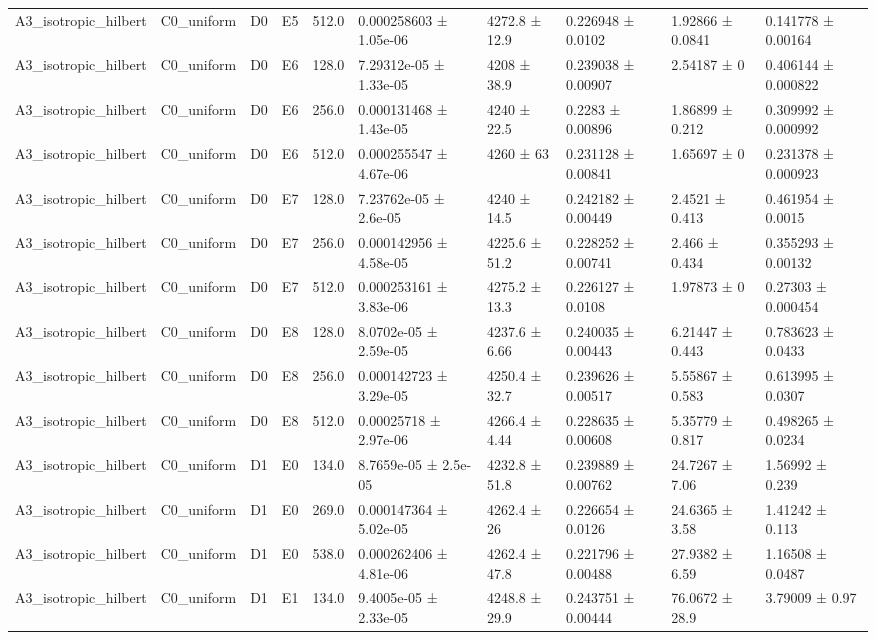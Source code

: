 \begin{table}
\begin{tabular}{llllllllll}
A3\_isotropic\_hilbert & C0\_uniform & D0 & E5 & 512.0 & 0.000258603 ± 1.05e-06 & 4272.8 ± 12.9 & 0.226948 ± 0.0102 & 1.92866 ± 0.0841 & 0.141778 ± 0.00164 \\
A3\_isotropic\_hilbert & C0\_uniform & D0 & E6 & 128.0 & 7.29312e-05 ± 1.33e-05 & 4208 ± 38.9 & 0.239038 ± 0.00907 & 2.54187 ± 0 & 0.406144 ± 0.000822 \\
A3\_isotropic\_hilbert & C0\_uniform & D0 & E6 & 256.0 & 0.000131468 ± 1.43e-05 & 4240 ± 22.5 & 0.2283 ± 0.00896 & 1.86899 ± 0.212 & 0.309992 ± 0.000992 \\
A3\_isotropic\_hilbert & C0\_uniform & D0 & E6 & 512.0 & 0.000255547 ± 4.67e-06 & 4260 ± 63 & 0.231128 ± 0.00841 & 1.65697 ± 0 & 0.231378 ± 0.000923 \\
A3\_isotropic\_hilbert & C0\_uniform & D0 & E7 & 128.0 & 7.23762e-05 ± 2.6e-05 & 4240 ± 14.5 & 0.242182 ± 0.00449 & 2.4521 ± 0.413 & 0.461954 ± 0.0015 \\
A3\_isotropic\_hilbert & C0\_uniform & D0 & E7 & 256.0 & 0.000142956 ± 4.58e-05 & 4225.6 ± 51.2 & 0.228252 ± 0.00741 & 2.466 ± 0.434 & 0.355293 ± 0.00132 \\
A3\_isotropic\_hilbert & C0\_uniform & D0 & E7 & 512.0 & 0.000253161 ± 3.83e-06 & 4275.2 ± 13.3 & 0.226127 ± 0.0108 & 1.97873 ± 0 & 0.27303 ± 0.000454 \\
A3\_isotropic\_hilbert & C0\_uniform & D0 & E8 & 128.0 & 8.0702e-05 ± 2.59e-05 & 4237.6 ± 6.66 & 0.240035 ± 0.00443 & 6.21447 ± 0.443 & 0.783623 ± 0.0433 \\
A3\_isotropic\_hilbert & C0\_uniform & D0 & E8 & 256.0 & 0.000142723 ± 3.29e-05 & 4250.4 ± 32.7 & 0.239626 ± 0.00517 & 5.55867 ± 0.583 & 0.613995 ± 0.0307 \\
A3\_isotropic\_hilbert & C0\_uniform & D0 & E8 & 512.0 & 0.00025718 ± 2.97e-06 & 4266.4 ± 4.44 & 0.228635 ± 0.00608 & 5.35779 ± 0.817 & 0.498265 ± 0.0234 \\
A3\_isotropic\_hilbert & C0\_uniform & D1 & E0 & 134.0 & 8.7659e-05 ± 2.5e-05 & 4232.8 ± 51.8 & 0.239889 ± 0.00762 & 24.7267 ± 7.06 & 1.56992 ± 0.239 \\
A3\_isotropic\_hilbert & C0\_uniform & D1 & E0 & 269.0 & 0.000147364 ± 5.02e-05 & 4262.4 ± 26 & 0.226654 ± 0.0126 & 24.6365 ± 3.58 & 1.41242 ± 0.113 \\
A3\_isotropic\_hilbert & C0\_uniform & D1 & E0 & 538.0 & 0.000262406 ± 4.81e-06 & 4262.4 ± 47.8 & 0.221796 ± 0.00488 & 27.9382 ± 6.59 & 1.16508 ± 0.0487 \\
A3\_isotropic\_hilbert & C0\_uniform & D1 & E1 & 134.0 & 9.4005e-05 ± 2.33e-05 & 4248.8 ± 29.9 & 0.243751 ± 0.00444 & 76.0672 ± 28.9 & 3.79009 ± 0.97 \\

\end{tabular}
\end{table}
